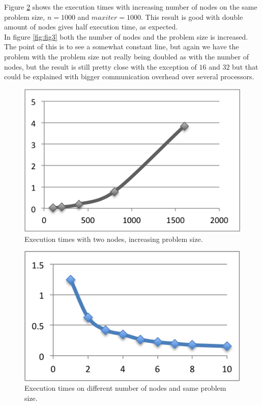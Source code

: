 \documentclass[a4paper]{article}
\begin{document}
Figure \ref{fig:fig2} shows the execution times with increasing number
of nodes on the same problem size, $n = 1000$ and $maxiter = 1000$. This
result is good with double amount of nodes gives half execution time, as
expected.\\

In figure \ref{fig:fig3} both the number of nodes and the problem size
is increased. The point of this is to see a somewhat constant line, but
again we have the problem with the problem size not really being doubled
as with the number of nodes, but the result is still pretty close with
the exception of $16$ and $32$ but that could be explained with bigger
communication overhead over several processors.

\begin{figure}
  \centering
  \includegraphics{samenodes.png}
  \caption{Execution times with two nodes, increasing problem size.}
  \label{fig:fig1}
\end{figure}

\begin{figure}
  \centering
  \includegraphics{lab3graph.png}
  \caption{Execution times on different number of nodes and same problem size.}
  \label{fig:fig2}
\end{figure}
\end{document}
